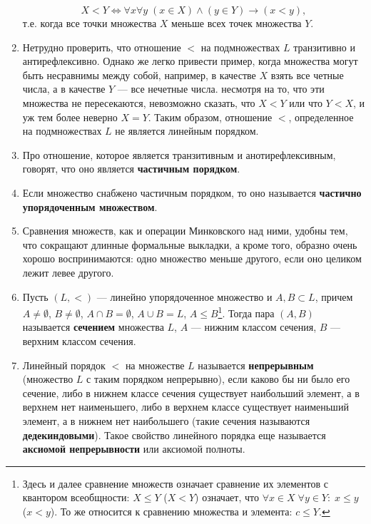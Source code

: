 \begin{enumerate}
$$
X<Y\Leftrightarrow \forall x\forall y\;(x\in X)\land(y\in Y)\to (x<y),
$$
т.е. когда все точки множества $X$ меньше всех точек множества $Y$.
\item Нетрудно проверить, что отношение $<$ на подмножествах $L$ транзитивно и антирефлексивно. Однако же легко привести пример, когда множества могут быть несравнимы между собой, например, в качестве  $X$ взять все четные числа, а в качестве $Y$ --- все нечетные числа. несмотря на то, что эти множества не пересекаются, невозможно сказать, что $X<Y$ или что $Y<X$, и уж тем более неверно $X=Y$. Таким образом, отношение $<$, определенное на подмножествах $L$ не является линейным порядком.
\item Про отношение, которое является транзитивным и анотирефлексивным, говорят, что оно является \textbf{частичным порядком}.
\item Если множество снабжено частичным порядком, то оно называется \textbf{частично упорядоченным множеством}.
\item Сравнения множеств, как и операции Минковского над ними, удобны тем, что сокращают длинные формальные выкладки, а кроме того, образно очень хорошо воспринимаются: одно множество меньше другого, если оно целиком лежит левее другого.

\item Пусть $(L,<)$ --- линейно упорядоченное множество и $A,B\subset L$, причем $A\ne\emptyset$, $B\ne\emptyset$, $A\cap B=\emptyset$, $A\cup B=L$, $A\le B$\footnote{Здесь и далее сравнение множеств означает сравнение их элементов с квантором всеобщности: $X\le Y$ ($X<Y$) означает, что $\forall x \in X\;\forall y\in Y:\; x\le y$ ($x<y$). То же относится к сравнению множества и элемента: $c\le Y$.}. Тогда пара $(A,B)$ называется \textbf{сечением} множества $L$, $A$ --- нижним классом сечения, $B$ --- верхним классом сечения.

\item Линейный порядок $<$ на множестве $L$ называется \textbf{непрерывным} (множество $L$ с таким порядком непрерывно), если каково бы ни было его сечение, либо в нижнем классе сечения существует наибольший элемент, а в верхнем нет наименьшего, либо в верхнем классе существует наименьший элемент, а в нижнем нет наибольшего (такие сечения называются \textbf{дедекиндовыми}). Такое свойство линейного порядка еще называется \textbf{аксиомой непрерывности} или аксиомой полноты.


\end{enumerate}
